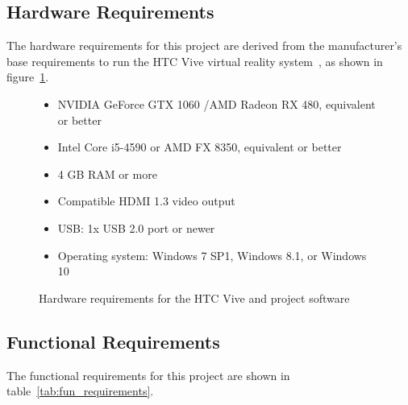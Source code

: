     \subsection{Hardware Requirements}
    
        The hardware requirements for this project are derived from the manufacturer's base requirements to run the HTC Vive virtual reality system~\cite{viveRequirements}, as shown in figure~\ref{fig:hardware}.
        
        \begin{figure}     
            \begin{itemize}
                \item NVIDIA GeForce GTX 1060 /AMD Radeon RX 480, equivalent or better
                \item Intel Core i5-4590 or AMD FX 8350, equivalent or better
                \item 4 GB RAM or more
                \item Compatible HDMI 1.3 video output
                \item USB: 1x USB 2.0 port or newer
                \item Operating system: Windows 7 SP1, Windows 8.1, or Windows 10
            \end{itemize}
            
            \caption{Hardware requirements for the HTC Vive and project software}
            \label{fig:hardware}
        \end{figure}

    \subsection{Functional Requirements}
    
        The functional requirements for this project are shown in table~\ref{tab:fun_requirements}.
    
